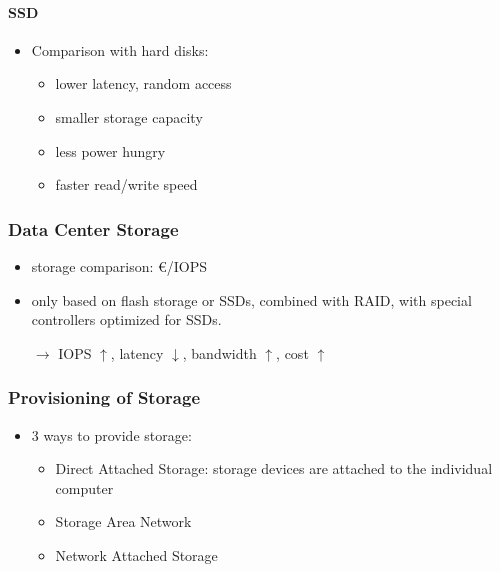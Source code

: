 \paragraph{SSD}
\begin{itemize}
	\item Comparison with hard disks:
	\begin{itemize}
		\item lower latency, random access
		\item smaller storage capacity
		\item less power hungry
		\item faster read/write speed
	\end{itemize}
\end{itemize}

\subsubsection{Data Center Storage}
\begin{itemize}
	\item storage comparison: \euro/IOPS 
	\item only based on flash storage or SSDs, combined with RAID, with special controllers optimized for SSDs.
	
	$\rightarrow$ IOPS $\uparrow$, latency $\downarrow$, bandwidth $\uparrow$, cost $\uparrow$
\end{itemize}


\subsubsection{Provisioning of Storage}
\begin{itemize}
	\item 3 ways to provide storage:
	\begin{itemize}
		\item Direct Attached Storage: storage devices are attached to the individual computer
		\item Storage Area Network
		\item Network Attached Storage
	\end{itemize}
\end{itemize}


